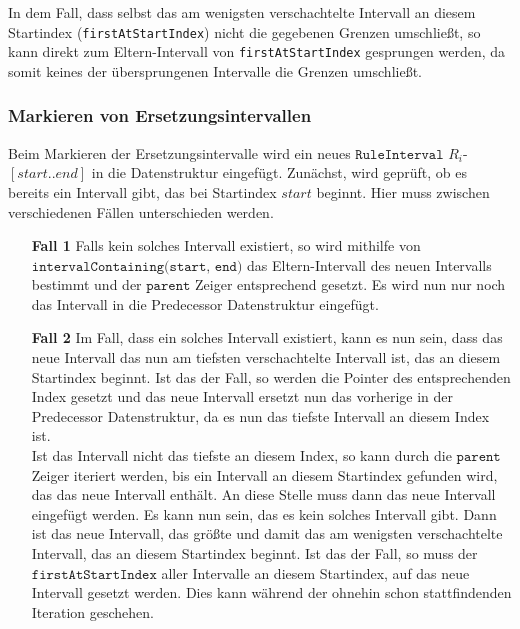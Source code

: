 In dem Fall, dass selbst das am wenigsten verschachtelte Intervall an diesem Startindex (\texttt{firstAtStartIndex}) nicht die gegebenen Grenzen umschließt, so kann direkt zum Eltern-Intervall von \texttt{firstAtStartIndex} gesprungen werden, da somit keines der übersprungenen Intervalle die Grenzen umschließt. 

\subsubsection{Markieren von Ersetzungsintervallen}

Beim Markieren der Ersetzungsintervalle wird ein neues $\texttt{RuleInterval}$ $R_i$-$[start..end]$ in die Datenstruktur eingefügt. 
Zunächst, wird geprüft, ob es bereits ein Intervall gibt, das bei Startindex $start$ beginnt.
Hier muss zwischen verschiedenen Fällen unterschieden werden.

\begin{itemize}[leftmargin=1.5cm]
    \item[\textbf{Fall 1}] Falls kein solches Intervall existiert, so wird mithilfe von\\
    $\texttt{intervalContaining(start, end)}$ das Eltern-Intervall des neuen Intervalls bestimmt und der $\texttt{parent}$ Zeiger entsprechend gesetzt.  Es wird nun nur noch das Intervall in die Predecessor Datenstruktur eingefügt.
    \item[\textbf{Fall 2}] Im Fall, dass ein solches Intervall existiert, kann es nun sein, dass das neue Intervall das nun am tiefsten verschachtelte Intervall ist, das an diesem Startindex beginnt. Ist das der Fall, so werden die Pointer des entsprechenden Index gesetzt und das neue Intervall ersetzt nun das vorherige in der Predecessor Datenstruktur, da es nun das tiefste Intervall an diesem Index ist.\\
    Ist das Intervall nicht das tiefste an diesem Index, so kann durch die $\texttt{parent}$ Zeiger iteriert werden, bis ein Intervall an diesem Startindex gefunden wird, das das neue Intervall enthält. An diese Stelle muss dann das neue Intervall eingefügt werden. Es kann nun sein, das es kein solches Intervall gibt. Dann ist das neue Intervall, das größte und damit das am wenigsten verschachtelte Intervall, das an diesem Startindex beginnt. Ist das der Fall, so muss der $\texttt{firstAtStartIndex}$ aller Intervalle an diesem Startindex, auf das neue Intervall gesetzt werden. Dies kann während der ohnehin schon stattfindenden Iteration geschehen. 
\end{itemize} 

